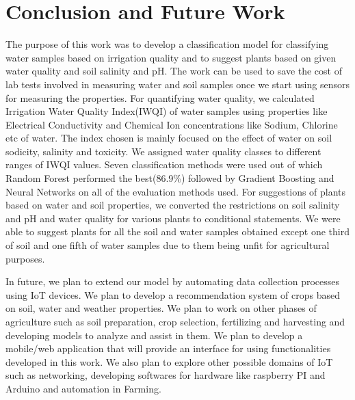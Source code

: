 \section{Conclusion and Future Work}
\label{section:conclusionAndFutureWork}
The purpose of this work was to develop a classification model for classifying water samples based on irrigation quality and to suggest plants based on given water quality and soil salinity and pH. The work can be used to save the cost of lab tests involved in measuring water and soil samples once we start using sensors for measuring the properties. For quantifying water quality, we calculated Irrigation Water Quality Index(IWQI) of water samples using properties like Electrical Conductivity and Chemical Ion concentrations like Sodium, Chlorine etc of water. The index chosen is mainly focused on the effect of water on soil sodicity, salinity and toxicity. We assigned water quality classes to different ranges of IWQI values. Seven classification methods were used out of which Random Forest performed the best(86.9\%) followed by Gradient Boosting and Neural Networks on all of the evaluation methods used. For suggestions of plants based on water and soil properties, we converted the restrictions on soil salinity and pH and water quality for various plants to conditional statements. We were able to suggest plants for all the soil and water samples obtained except one third of soil and one fifth of water samples due to them being unfit for agricultural purposes.

In future, we plan to extend our model by automating data collection processes using IoT devices. We plan to develop a recommendation system of crops based on soil, water and weather properties. We plan to work on other phases of agriculture such as soil preparation, crop selection, fertilizing and harvesting and developing models to analyze and assist in them. We plan to develop a mobile/web application that will provide an interface for using functionalities developed in this work. We also plan to explore other possible domains of IoT such as networking, developing softwares for hardware like raspberry PI and Arduino and automation in Farming.





 



